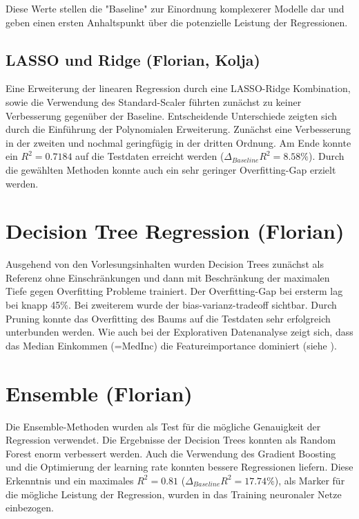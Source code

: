 \documentclass[9pt,a4paper,twocolumn,twoside]{tau-class/tau}
\begin{document}
        Diese Werte stellen die "Baseline" zur Einordnung komplexerer Modelle dar
        und geben einen ersten Anhaltspunkt über die potenzielle Leistung der Regressionen.

        \subsection{LASSO und Ridge (Florian, Kolja)}
        Eine Erweiterung der linearen Regression durch eine LASSO-Ridge Kombination, sowie die Verwendung des Standard-Scaler führten zunächst zu keiner Verbesserung gegenüber der Baseline.
        Entscheidende Unterschiede zeigten sich durch die Einführung der Polynomialen Erweiterung. 
        Zunächst eine Verbesserung in der zweiten und  nochmal geringfügig in der dritten Ordnung. Am Ende konnte ein $R^2 =  0.7184 $
        auf die Testdaten erreicht werden ($\Delta_{Baseline} R^2 = 8.58\%$). 
        Durch die gewählten Methoden konnte auch ein sehr geringer Overfitting-Gap erzielt werden.

        
\section{Decision Tree Regression (Florian)}
        Ausgehend von den Vorlesungsinhalten wurden Decision Trees zunächst als Referenz ohne Einschränkungen
        und dann mit Beschränkung der maximalen Tiefe gegen Overfitting Probleme trainiert. 
        Der Overfitting-Gap bei ersterm lag bei knapp 45\%. Bei zweiterem wurde der bias-varianz-tradeoff sichtbar.
        Durch Pruning konnte das Overfitting des Baums auf die Testdaten sehr erfolgreich unterbunden werden. 
        Wie auch bei der Explorativen Datenanalyse zeigt sich, dass das Median Einkommen (=MedInc) die Featureimportance dominiert 
        (siehe ). 

\section{Ensemble (Florian)}
        Die Ensemble-Methoden wurden als Test für die mögliche Genauigkeit der Regression verwendet.
        Die Ergebnisse der Decision Trees konnten als Random Forest enorm verbessert werden. 
        Auch die Verwendung des Gradient Boosting und die Optimierung der learning rate konnten bessere Regressionen liefern. 
        Diese Erkenntnis und ein maximales $R^2 = 0.81$ ($\Delta_{Baseline} R^2 = 17.74\%$), als Marker für die mögliche Leistung der Regression,
        wurden in das Training neuronaler Netze einbezogen.
\end{document}
